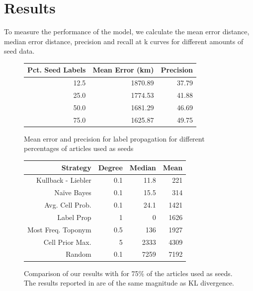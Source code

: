 
\section{Results} 

To measure the performance of the model, we calculate the mean error distance,
median error distance, precision and recall at k curves for different amounts
of seed data.


\begin{figure}[htbp]
\begin{minipage}[t]{0.45\linewidth}
\centering
	\begin{tabular}{|r|r|r|}
	\hline
	Pct. Seed Labels & Mean Error (km) & Precision \\
	\hline
	12.5 & 1870.89 & 37.79 \\
	25.0 & 1774.53 & 41.88 \\
	50.0 & 1681.29 & 46.69 \\
	75.0 & 1625.87 & 49.75 \\
	\hline
	\end{tabular}
	\caption{Mean error and precision for label propagation for different percentages of articles used as seeds}
	\label{tab:results}
\end{minipage}
\hspace{0.5cm}
\begin{minipage}[t]{0.45\linewidth}
\centering
	\begin{tabular}{|r|r|r|r|}
	\hline
	Strategy & Degree & Median & Mean \\
	\hline
	Kullback - Liebler & 0.1 & 11.8 & 221 \\
	Naïve Bayes & 0.1 & 15.5 & 314 \\
	Avg. Cell Prob. & 0.1 & 24.1 & 1421 \\
	Label Prop & 1 & 0 &  1626 \\
	Most Freq. Toponym &  0.5 &  136 & 1927 \\
	Cell Prior Max. & 5 & 2333 & 4309 \\
	Random & 0.1 &7259 & 7192 \\
	\hline
	\end{tabular}
	\caption{Comparison of our results with  for 75\% of the articles used as seeds. The results reported in  are of the same magnitude as KL divergence.}
	\label{tab:comparison}

\end{minipage}
\end{figure}


